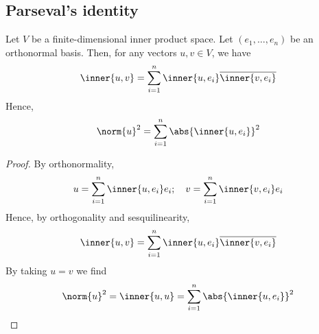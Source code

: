 \subsection{Parseval's identity}
\begin{corollary}
	Let $V$ be a finite-dimensional inner product space.
	Let $(e_1, \dots, e_n)$ be an orthonormal basis.
	Then, for any vectors $u, v \in V$, we have
	\begin{align*}
		\inner{u, v} = \sum_{i=1}^n \inner{u, e_i} \overline{\inner{v, e_i}}
	\end{align*}
	Hence,
	\begin{align*}
		\norm{u}^2 = \sum_{i=1}^n \abs{\inner{u,e_i}}^2
	\end{align*}
\end{corollary}

\begin{proof}
	By orthonormality,
	\begin{align*}
		u = \sum_{i=1}^n \inner{u, e_i} e_i;\quad v = \sum_{i=1}^n \inner{v, e_i} e_i
	\end{align*}
	Hence, by orthogonality and sesquilinearity,
	\begin{align*}
		\inner{u,v} = \sum_{i=1}^n \inner{u, e_i} \overline{\inner{v, e_i}}
	\end{align*}
	By taking $u = v$ we find
	\begin{align*}
		\norm{u}^2 = \inner{u,u} = \sum_{i=1}^n \abs{\inner{u,e_i}}^2
	\end{align*}
\end{proof}

